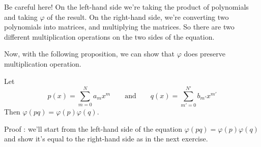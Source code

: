 Be careful here! On the left-hand side we're taking the product of polynomials and taking $\varphi$ of the result. On the right-hand side, we're converting two polynomials into matrices, and multiplying the matrices.
So there are two different multiplication operations on the two sides of the equation.
%



%
%
%

Now, with the following proposition, we can show that $\varphi$ does preserve multiplication operation.

\begin{prop}{}
	Let  \[p(x) = \sum^ {N}_{m=0} a_{m}x^{m}\qquad \text {and}  \qquad q(x) = \sum^ {N'}_{m'=0} b_{m'}x^{m'}\]
	Then $\varphi(pq) = \varphi(p) \varphi(q)$.
	
	Proof : we'll start from the left-hand side of the equation $\varphi(pq) = \varphi(p) \varphi(q)$ and show it's equal to the right-hand side as in the next exercise.
\end{prop}

